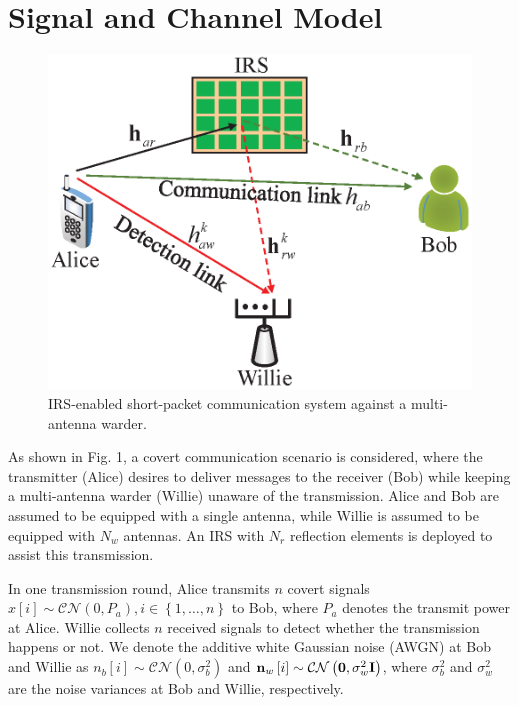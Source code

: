 \documentclass[conference]{IEEEtran}
\begin{document}
\section{Signal and Channel Model}
\begin{figure}
	\centering
	\includegraphics[width=0.85\linewidth]{figure/system.eps}
	\caption{IRS-enabled short-packet communication system against a multi-antenna warder.}
	\label{fig_sim}
\end{figure}
As shown in Fig. 1, a covert communication scenario is considered, where the transmitter (Alice) desires to deliver messages to the receiver (Bob) while keeping a multi-antenna warder (Willie) unaware of the transmission. Alice and Bob are assumed to be equipped with a single antenna, while Willie is assumed to be equipped with $N_w$ antennas. An IRS with $N_r$ reflection elements is deployed to assist this transmission.


In one transmission round, Alice transmits $n$ covert signals $x\left[ i \right] \sim \mathcal{CN}\left( {0,P_a} \right),i \in \left\{ {1, \ldots ,n} \right\}$ to Bob, where $P_a$ denotes the transmit power at Alice.  Willie collects $n$ received signals to detect whether the transmission happens or not. We denote the additive white Gaussian noise (AWGN) at Bob and Willie as ${{{n}}_b}\left[ i \right] \sim \mathcal{CN}\left( {0,\sigma _b^2} \right)$ and ${{\bf{n}}_w}\left[ i \right] \sim \mathcal{CN}\left( {{\bf{0}},\sigma_w^2{\bf{I}}} \right)$, where $\sigma_b^2$ and $\sigma_w^2$ are the noise variances at Bob and Willie, respectively.
\end{document}
